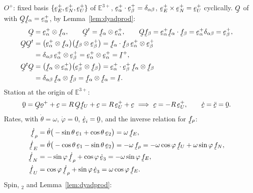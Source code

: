 \begin{solution}
$O^{+}$: fixed basis $\{\be^{+}_{E},\be^{+}_{N},\be^{+}_{U}\}$ of
$\mathbb{E}^{3+}$, $\ip{\be^{+}_{\alpha}}{\be^{+}_{\beta}}
=\dd_{\alpha\beta}$, $\be^{+}_{E}\times\be^{+}_{N}=\be^{+}_{U}$
cyclically. $\bQ$ of  with $\bQ\bff_{\alpha}=\be^{+}_{\alpha}$,
by Lemma~\ref{lem:dyadprod}:
\begin{align*}
   \bQ&=\be^{+}_{\alpha}\otimes\bff_{\alpha},\qquad
   \bQ^{t}=\bff_{\alpha}\otimes\be^{+}_{\alpha},\qquad
   \bQ\bff_{\beta}=\be^{+}_{\alpha}\ip{\bff_{\alpha}}{\bff_{\beta}}
     =\be^{+}_{\alpha}\dd_{\alpha\beta}=\be^{+}_{\beta},\\
   \bQ\bQ^{t}&=\big(\be^{+}_{\alpha}\otimes\bff_{\alpha}\big)
     \big(\bff_{\beta}\otimes\be^{+}_{\beta}\big)
   =\ip{\bff_{\alpha}}{\bff_{\beta}}\,
     \be^{+}_{\alpha}\otimes\be^{+}_{\beta}\\
   &=\dd_{\alpha\beta}\,\be^{+}_{\alpha}\otimes\be^{+}_{\beta}
   =\be^{+}_{\alpha}\otimes\be^{+}_{\alpha}=\I^{+},\\
   \bQ^{t}\bQ&=\big(\bff_{\alpha}\otimes\be^{+}_{\alpha}\big)
     \big(\be^{+}_{\beta}\otimes\bff_{\beta}\big)
   =\ip{\be^{+}_{\alpha}}{\be^{+}_{\beta}}\,
     \bff_{\alpha}\otimes\bff_{\beta}\\
   &=\dd_{\alpha\beta}\,\bff_{\alpha}\otimes\bff_{\beta}
   =\bff_{\alpha}\otimes\bff_{\alpha}=\I .
\end{align*}
Station at the origin of $\mathbb{E}^{3+}$:
\begin{equation*}
   \bze=\bQ\bo^{+}+\bc=R\,\bQ\bff_{U}+\bc=R\,\be^{+}_{U}+\bc
   \ \Longrightarrow\
   \bc=-R\,\be^{+}_{U},\qquad
   \dot\bc=\ddot\bc=\bze .
\end{equation*}
Rates, with $\dot\theta=\omega$, $\dot\varphi=0$, $\dot\be_{i}=\bze$,
and the inverse relation for $\bff_{\rho}$:
\begin{align*}
   \dot\bff_{\rho}&=\dot\theta\big(-\sin\theta\,\be_{1}
      +\cos\theta\,\be_{2}\big)=\omega\,\bff_{E},\\
   \dot\bff_{E}&=\dot\theta\big(-\cos\theta\,\be_{1}
      -\sin\theta\,\be_{2}\big)=-\omega\,\bff_{\rho}
      =-\omega\cos\varphi\,\bff_{U}+\omega\sin\varphi\,\bff_{N},\\
   \dot\bff_{N}&=-\sin\varphi\,\dot\bff_{\rho}+\cos\varphi\,\dot\be_{3}
      =-\omega\sin\varphi\,\bff_{E},\\
   \dot\bff_{U}&=\cos\varphi\,\dot\bff_{\rho}+\sin\varphi\,\dot\be_{3}
      =\omega\cos\varphi\,\bff_{E}.
\end{align*}
Spin, $_{2}$ and Lemma~\ref{lem:dyadprod}:
\begin{align*}

\end{align*}
\end{solution}
